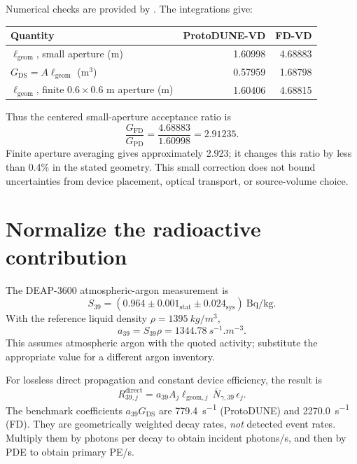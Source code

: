 \documentclass[11pt]{article}
\begin{document}
Numerical checks are provided by .
The integrations give:
\begin{center}
\begin{tabular}{lrr}
\toprule
Quantity & ProtoDUNE-VD & FD-VD \\
\midrule
$\ell_{\mathrm{geom}}$, small aperture (m) & 1.60998 & 4.68883 \\
$G_{\mathrm{DS}}=A\ell_{\mathrm{geom}}$ (m$^3$) & 0.57959 & 1.68798 \\
$\ell_{\mathrm{geom}}$, finite $0.6\times0.6$ m aperture (m) & 1.60406 & 4.68815 \\
\bottomrule
\end{tabular}
\end{center}
Thus the centered small-aperture acceptance ratio is
\begin{equation}
\boxed{\frac{G_{\mathrm{FD}}}{G_{\mathrm{PD}}}
=\frac{4.68883}{1.60998}=2.91235.}
\label{eq:ratio39}
\end{equation}
Finite aperture averaging gives approximately 2.923; it changes this ratio by
less than 0.4\% in the stated geometry. This small correction does not bound
uncertainties from device placement, optical transport, or source-volume choice.

\section{Normalize the radioactive contribution}

The DEAP-3600 atmospheric-argon measurement is~\cite{ar39}
\begin{equation}
S_{39}=(0.964\pm0.001_{\mathrm{stat}}\pm0.024_{\mathrm{sys}})
\ \mathrm{Bq/kg}.
\end{equation}
With the reference liquid density $\rho=\SI{1395}{kg/m^3}$,
\begin{equation}
a_{39}=S_{39}\rho=\SI{1344.78}{s^{-1}.m^{-3}}.
\end{equation}
This assumes atmospheric argon with the quoted activity; substitute the
appropriate value for a different argon inventory.

For lossless direct propagation and constant device efficiency, the result is
\begin{equation}
\boxed{R_{39,j}^{\mathrm{direct}}
=a_{39}A_j\ell_{\mathrm{geom},j}\,
\overline N_{\gamma,39}\,\epsilon_j.}
\label{eq:R39}
\end{equation}
The benchmark coefficients $a_{39}G_{\mathrm{DS}}$ are
\SI{779.4}{s^{-1}} (ProtoDUNE) and \SI{2270.0}{s^{-1}} (FD).
They are geometrically weighted decay rates, \emph{not} detected event rates.
Multiply them by photons per decay to obtain incident photons/s, and then
by PDE to obtain primary PE/s.
\end{document}
